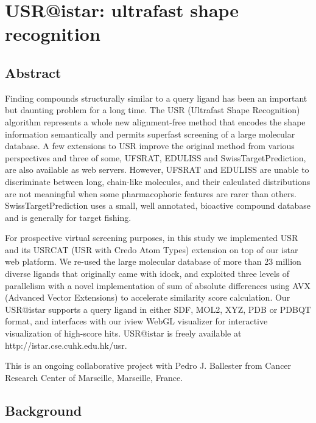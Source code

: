 \chapter{USR@istar: ultrafast shape recognition}
\label{usr}

\section{Abstract}

Finding compounds structurally similar to a query ligand has been an important but daunting problem for a long time. The USR (Ultrafast Shape Recognition) algorithm represents a whole new alignment-free method that encodes the shape information semantically and permits superfast screening of a large molecular database. A few extensions to USR improve the original method from various perspectives and three of some, UFSRAT, EDULISS and SwissTargetPrediction, are also available as web servers. However, UFSRAT and EDULISS are unable to discriminate between long, chain-like molecules, and their calculated distributions are not meaningful when some pharmacophoric features are rarer than others. SwissTargetPrediction uses a small, well annotated, bioactive compound database and is generally for target fishing.

For prospective virtual screening purposes, in this study we implemented USR and its USRCAT (USR with Credo Atom Types) extension on top of our istar web platform. We re-used the large molecular database of more than 23 million diverse ligands that originally came with idock, and exploited three levels of parallelism with a novel implementation of sum of absolute differences using AVX (Advanced Vector Extensions) to accelerate similarity score calculation. Our USR@istar supports a query ligand in either SDF, MOL2, XYZ, PDB or PDBQT format, and interfaces with our iview WebGL visualizer for interactive visualization of high-score hits. USR@istar is freely available at http://istar.cse.cuhk.edu.hk/usr.

This is an ongoing collaborative project with Pedro J. Ballester from Cancer Research Center of Marseille, Marseille, France.

\section{Background}

